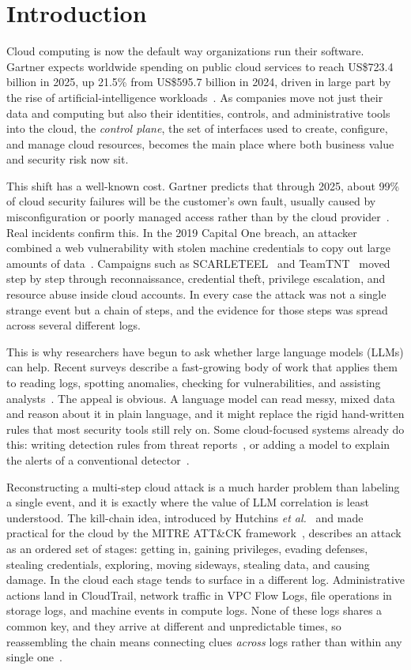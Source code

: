 \documentclass[journal]{IEEEtran}
\begin{document}
\section{Introduction}
Cloud computing is now the default way organizations run their software. Gartner expects worldwide
spending on public cloud services to reach US\$723.4 billion in
2025, up 21.5\% from US\$595.7 billion in 2024, driven in large part by the rise of
artificial-intelligence workloads~\cite{gartner25}. As companies move not just their data and
computing but also their identities, controls, and administrative tools into the cloud, the
\emph{control plane}, the set of interfaces used to create, configure, and manage cloud
resources, becomes the main place where both business value and security risk now sit.

This shift has a well-known cost. Gartner predicts that through 2025, about 99\% of cloud security
failures will be the customer's own fault, usually caused by misconfiguration or poorly managed
access rather than by the cloud provider~\cite{gartner99}. Real incidents confirm this. In the 2019
Capital One breach, an attacker combined a web vulnerability with stolen machine credentials to copy
out large amounts of data~\cite{capitalone}. Campaigns such as SCARLETEEL~\cite{scarleteel} and
TeamTNT~\cite{teamtnt} moved step by step through reconnaissance, credential theft, privilege
escalation, and resource abuse inside cloud accounts. In every case the attack was not a single
strange event but a chain of steps, and the evidence for those steps was spread across several
different logs.

This is why researchers have begun to ask whether large language models (LLMs) can help. Recent surveys
describe a fast-growing body of work that applies them to reading logs, spotting anomalies, checking for
vulnerabilities, and assisting analysts~\cite{llmsurvey1, llmsurvey2, llmsurvey3}. The appeal is obvious.
A language model can read messy, mixed data and reason about it in plain language, and it might replace
the rigid hand-written rules that most security tools still rely on. Some cloud-focused systems already
do this: writing detection rules from threat reports~\cite{llmcloudhunter}, or adding a model to explain
the alerts of a conventional detector~\cite{huntgpt}.

Reconstructing a multi-step cloud attack is a much harder problem than labeling a single event, and it
is exactly where the value of LLM correlation is least understood. The kill-chain idea, introduced by
Hutchins \emph{et al.}~\cite{hutchins} and made practical for the cloud by the MITRE ATT\&CK
framework~\cite{mitre}, describes an attack as an ordered set of stages: getting in, gaining privileges,
evading defenses, stealing credentials, exploring, moving sideways, stealing data, and causing damage.
In the cloud each stage tends to surface in a different log. Administrative actions land in CloudTrail,
network traffic in VPC Flow Logs, file operations in storage logs, and machine events in compute logs.
None of these logs shares a common key, and they arrive at different and unpredictable times, so
reassembling the chain means connecting clues \emph{across} logs rather than within any single
one~\cite{wilkens, hetfusion}.
\end{document}
